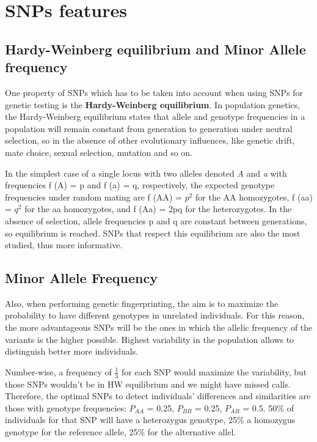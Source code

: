 \section{SNPs features}

\subsection{Hardy-Weinberg equilibrium and Minor Allele frequency}

One property of SNPs which has to be taken into account when using SNPs for genetic testing is the \textbf{Hardy-Weinberg equilibrium}. 
In population genetics, the Hardy-Weinberg equilibrium states that allele and genotype frequencies in a population will remain constant from generation to generation under neutral selection, so in the absence of other evolutionary influences, like genetic drift, mate choice, sexual selection, mutation and so on.

In the simplest case of a single locus with two alleles denoted \emph{A} and \emph{a} with frequencies f (A) = p and f (a) = q, respectively, the expected genotype frequencies under random mating are f (AA) = $p^{2}$ for the AA homozygotes, f (aa) = $q^{2}$ for the aa homozygotes, and f (Aa) = 2pq for the heterozygotes. In the absence of selection, allele frequencies p and q are constant between generations, so equilibrium is reached.
SNPs that respect this equilibrium are also the most studied, thus more informative. 

\subsection{Minor Allele Frequency}

Also, when performing genetic fingerprinting, the aim is to maximize the probability to have different genotypes in unrelated individuals. 
For this reason, the more advantageous SNPs will be the ones in which the allelic frequency of the variants is the higher possible. Highest variability in the population allows to distinguish better more individuals. 

Number-wise, a frequency of $\frac{1}{3}$ for each SNP would maximize the variability, but those SNPs wouldn't be in HW equilibrium and we might have missed calls. 
Therefore, the optimal SNPs to detect individuals’ differences and similarities are those with genotype frequencies: $P_{AA}$ = 0.25, $P_{BB}$ = 0.25, $P_{AB}$ = 0.5. 50\% of individuals for that SNP will have a heterozygus genotype, 25\% a homozygus genotype for the reference allele, 25\% for the alternative allel.

